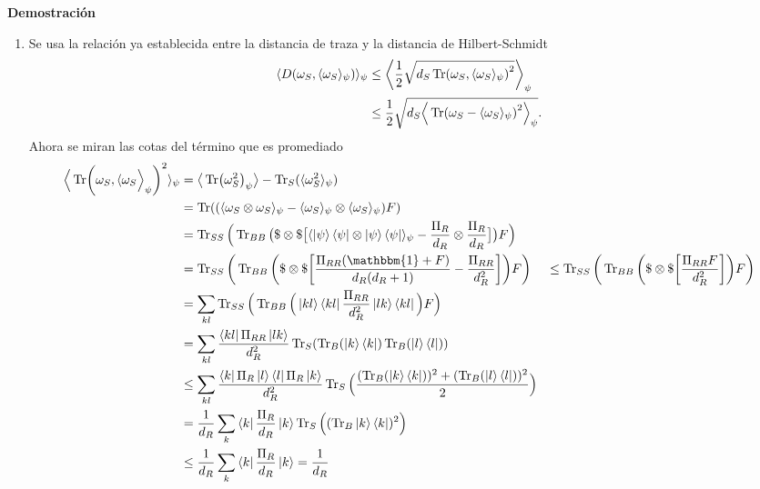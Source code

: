 \textbf{Demostración}
\begin{enumerate}
\item Se usa la relación ya establecida entre la distancia de traza y la distancia de Hilbert-Schmidt
\begin{align*}\label{a12}
\langle D(\omega_{S}, \langle \omega_{S} \rangle_{\psi}) \rangle_{\psi} &\leq \bigg \langle \frac{1}{2} \sqrt{d_{S} \Tr (\omega_{S}, \langle \omega_{S} \rangle_{\psi})^{2}} \bigg \rangle_{\psi}\\
&\leq \frac{1}{2} \sqrt{d_{S} \Big \langle \Tr (\omega_{S} - \langle \omega_{S} \rangle_{\psi})^{2} \Big \rangle_{\psi}}.
\end{align*}
Ahora se miran las cotas del término que es promediado
\begin{align*}
\Big \langle \Tr (\omega_{S}, \langle \omega_{S} \Big \rangle_{\psi})^{2} \rangle_{\psi}  &= \big \langle \Tr(\omega_{S}^{2})_{\psi} \big \rangle - \Tr_{S} (\langle \omega_{S}^{2} \rangle_{\psi})\\
&=\Tr (   (\langle \omega_{S} \otimes \omega_{S} \rangle_{\psi} - \langle \omega_{S} \rangle_{\psi} \otimes \langle \omega_{S} \rangle_{\psi} )F )\\
&= \Tr_{SS} \Big( \Tr_{BB} \big( \$ \otimes \$ \big[ \langle \ket{\psi}\bra{\psi} \otimes  \ket{\psi}\bra{\psi}\rangle_{\psi} - \frac{\Pi_{R}}{d_{R}} \otimes  \frac{\Pi_{R}}{d_{R}}  \big]  \big) F \Big)\\
&= \Tr_{SS} \bigg( \Tr_{BB} \bigg( \$ \otimes \$ \bigg[ \frac{\Pi_{RR}(\mathbbm{1}+F)}{d_{R}(d_{R}+1)} - \frac{\Pi_{RR}}{d_{R}^{2}}  \bigg]  \bigg) F \bigg)
&\leq \Tr_{SS} \bigg(  \Tr_{BB} \bigg( \$ \otimes \$ \bigg[ \frac{\Pi_{RR}F}{d_{R}^{2}} \bigg] \bigg) F \bigg)\\
&= \sum_{kl}  \Tr_{SS} \Big(  \Tr_{BB} \Big( \ket{kl}\bra{kl} \frac{\Pi_{RR}}{d_{R}^{2}}  \ket{lk}\bra{kl} \Big) F \Big)\\
&= \sum_{kl} \frac{\bra{kl}\Pi_{RR}\ket{lk}}{d_{R}^{2}} \Tr_{S}(\Tr_{B}(\ket{k}\bra{k}) \Tr_{B}(\ket{l}\bra{l}) )\\
&\leq \sum_{kl} \frac{\bra{k}\Pi_{R}\ket{l}\bra{l}\Pi_{R}\ket{k}}{d_{R}^{2}} \Tr_{S} \Big( \frac{(\Tr_{B}(\ket{k}\bra{k}))^{2}+(\Tr_{B}(\ket{l}\bra{l}))^{2}}{2} \Big)\\
&=\frac{1}{d_{R}} \sum_{k} \bra{k} \frac{\Pi_{R}}{d_{R}} \ket{k} \Tr_{S} \Big( (\Tr_{B} \ket{k}\bra{k})^{2} \Big)\\
&\leq \frac{1}{d_{R}} \sum_{k} \bra{k} \frac{\Pi_{R}}{d_{R}} \ket{k} = \frac{1}{d_{R}}
\end{align*}

\end{enumerate}
